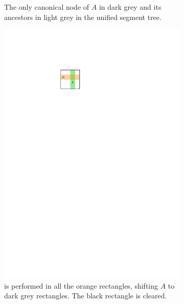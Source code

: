 \documentclass[english,gradu]{tktltiki2018}
\begin{document}
\begin{figure}
\begin{subfigure}[t]{0.4\textwidth}
		\caption{The only canonical node of $A$ in dark grey and its ancestors in light grey in the unified segment tree.}\label{fig:urm:canon}
	\end{subfigure}
	\hfil
	\begin{subfigure}[t]{0.4\textwidth}\centering
		\includegraphics[width=\textwidth,page=4]{fig/uremove}
		\caption{\pdst is performed in all the orange rectangles, shifting $A$ to dark grey rectangles. The black rectangle is cleared.}\label{fig:urm:push}
	\end{subfigure}
	\hfil
	\begin{subfigure}[t]{0.4\textwidth}\centering

\end{subfigure}
\end{figure}
\end{document}
